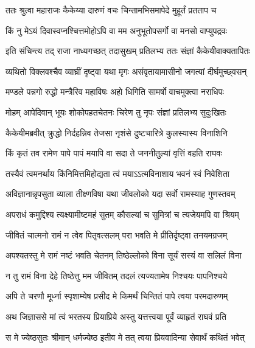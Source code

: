 
\twolineshloka
{ततः श्रुत्वा महाराजः कैकेय्या दारुणं वचः}
{चिन्तामभिसमापेदे मुहूर्तं प्रतताप च} %

\twolineshloka
{किं नु मेऽयं दिवास्वप्नश्चित्तमोहोऽपि वा मम}
{अनुभूतोपसर्गो वा मनसो वाप्युपद्रवः} %

\twolineshloka
{इति संचिन्त्य तद् राजा नाध्यगच्छत् तदासुखम्}
{प्रतिलभ्य ततः संज्ञां कैकेयीवाक्यतापितः} %

\twolineshloka
{व्यथितो विक्लवश्चैव व्याघ्रीं दृष्ट्वा यथा मृगः}
{असंवृतायामासीनो जगत्यां दीर्घमुच्छ्वसन्} %

\twolineshloka
{मण्डले पन्नगो रुद्धो मन्त्रैरिव महाविषः}
{अहो धिगिति सामर्षो वाचमुक्त्वा नराधिपः} %

\twolineshloka
{मोहम् आपेदिवान् भूयः शोकोपहतचेतनः}
{चिरेण तु नृपः संज्ञां प्रतिलभ्य सुदुःखितः} %

\twolineshloka
{कैकेयीमब्रवीत् क्रुद्धो निर्दहन्निव तेजसा}
{नृशंसे दुष्टचारित्रे कुलस्यास्य विनाशिनि} %

\twolineshloka
{किं कृतं तव रामेण पापे पापं मयापि वा}
{सदा ते जननीतुल्यां वृत्तिं वहति राघवः} %

\twolineshloka
{तस्यैवं त्वमनर्थाय किंनिमित्तमिहोद्यता}
{त्वं मयाऽऽत्मविनाशाय भवनं स्वं निवेशिता} %

\twolineshloka
{अविज्ञानान्नृपसुता व्याला तीक्ष्णविषा यथा}
{जीवलोको यदा सर्वो रामस्याह गुणस्तवम्} %

\twolineshloka
{अपराधं कमुद्दिश्य त्यक्ष्यामीष्टमहं सुतम्}
{कौसल्यां च सुमित्रां च त्यजेयमपि वा श्रियम्} %

\twolineshloka
{जीवितं चात्मनो रामं न त्वेव पितृवत्सलम्}
{परा भवति मे प्रीतिर्दृष्ट्वा तनयमग्रजम्} %

\twolineshloka
{अपश्यतस्तु मे रामं नष्टं भवति चेतनम्}
{तिष्ठेल्लोको विना सूर्यं सस्यं वा सलिलं विना} %

\twolineshloka
{न तु रामं विना देहे तिष्ठेत्तु मम जीवितम्}
{तदलं त्यज्यतामेष निश्चयः पापनिश्चये} %

\twolineshloka
{अपि ते चरणौ मूर्ध्ना स्पृशाम्येष प्रसीद मे}
{किमर्थं चिन्तितं पापे त्वया परमदारुणम्} %

\twolineshloka
{अथ जिज्ञाससे मां त्वं भरतस्य प्रियाप्रिये}
{अस्तु यत्तत्त्वया पूर्वं व्याहृतं राघवं प्रति} %

\twolineshloka
{स मे ज्येष्ठसुतः श्रीमान् धर्मज्येष्ठ इतीव मे}
{तत् त्वया प्रियवादिन्या सेवार्थं कथितं भवेत्} %

